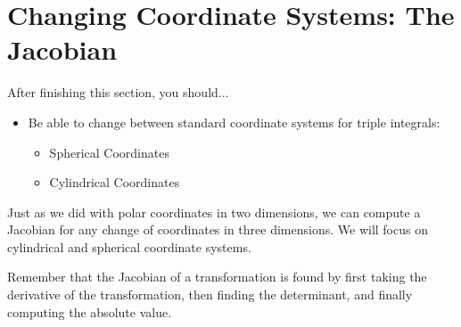 \documentclass[10pt,]{book}
\theoremstyle{plain}
\theoremstyle{definition}
\theoremstyle{definition}
\theoremstyle{definition}
\theoremstyle{definition}
\theoremstyle{definition}
\numberwithin{equation}{section}
\begin{document}
\section[{Changing Coordinate Systems: The Jacobian}]{Changing Coordinate Systems: The Jacobian}\label{section-47}
After finishing this section, you should...%
\leavevmode%
\begin{itemize}[label=\textbullet]
\item{}Be able to change between standard coordinate systems for triple integrals:%
%
\begin{itemize}[label=$\circ$]
\item{}Spherical Coordinates%
\item{}Cylindrical Coordinates%
\end{itemize}
\end{itemize}
Just as we did with polar coordinates in two dimensions, we can compute a Jacobian for any change of coordinates in three dimensions. We will focus on cylindrical and spherical coordinate systems.%
\par
Remember that the Jacobian of a transformation is found by first taking the derivative of the transformation, then finding the determinant, and finally computing the absolute value.%
\end{document}
